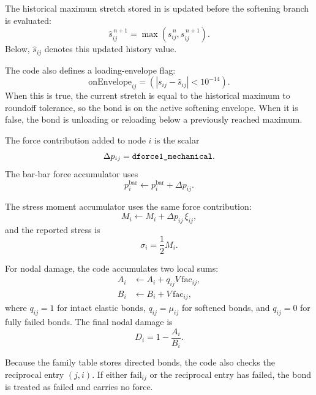 \documentclass[11pt]{article}
\newcommand{\code}[1]{\texttt{\detokenize{#1}}}
\begin{document}
The historical maximum stretch stored in \code{bond_s_history[i][j]} is updated
before the softening branch is evaluated:
\begin{equation}
    \hat{s}_{ij}^{\,n+1}
    =
    \max\left(
        \hat{s}_{ij}^{\,n},
        s_{ij}^{\,n+1}
    \right).
\end{equation}
Below, \(\hat{s}_{ij}\) denotes this updated history value.

The code also defines a loading-envelope flag:
\begin{equation}
    \mathrm{onEnvelope}_{ij}
    =
    \left(
        |s_{ij}-\hat{s}_{ij}| < 10^{-14}
    \right).
\end{equation}
When this is true, the current stretch is equal to the historical maximum to
roundoff tolerance, so the bond is on the active softening envelope. When it is
false, the bond is unloading or reloading below a previously reached maximum.

The force contribution added to node \(i\) is the scalar
\begin{equation}
    \Delta p_{ij}
    =
    \code{dforce1_mechanical}.
\end{equation}
The bar-bar force accumulator uses
\begin{equation}
    p_i^{\mathrm{bar}}
    \leftarrow
    p_i^{\mathrm{bar}}+\Delta p_{ij}.
\end{equation}

The stress moment accumulator uses the same force contribution:
\begin{equation}
    M_i
    \leftarrow
    M_i+\Delta p_{ij}\,\xi_{ij},
\end{equation}
and the reported stress is
\begin{equation}
    \sigma_i = \frac{1}{2}M_i.
\end{equation}

For nodal damage, the code accumulates two local sums:
\begin{align}
    A_i &\leftarrow A_i + q_{ij}V\,\mathrm{fac}_{ij}, \\
    B_i &\leftarrow B_i + V\,\mathrm{fac}_{ij},
\end{align}
where \(q_{ij}=1\) for intact elastic bonds, \(q_{ij}=\mu_{ij}\) for softened
bonds, and \(q_{ij}=0\) for fully failed bonds. The final nodal damage is
\begin{equation}
    D_i = 1-\frac{A_i}{B_i}.
\end{equation}

Because the family table stores directed bonds, the code also checks the
reciprocal entry \((j,i)\). If either \(\mathrm{fail}_{ij}\) or the reciprocal
entry has failed, the bond is treated as failed and carries no force.
\end{document}
